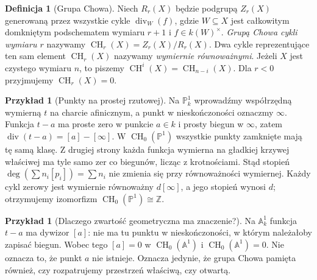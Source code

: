 \documentclass[11pt,a4paper,openany]{report}
\numberwithin{equation}{section}
\theoremstyle{plain}
\theoremstyle{definition}
\newtheorem{definicja}[twierdzenie]{Definicja}
\newtheorem{przyklad}[twierdzenie]{Przykład}
\theoremstyle{remark}
\newcommand{\Z}{\mathbb Z}
\newcommand{\A}{\mathbb A}
\newcommand{\PP}{\mathbb P}
\begin{document}
\begin{definicja}[Grupa Chowa]
\label{def:ga7-chow}
Niech $R_r(X)$ będzie podgrupą $Z_r(X)$ generowaną przez
wszystkie cykle $\operatorname{div}_W(f)$, gdzie
$W\subseteq X$ jest całkowitym domkniętym podschematem
wymiaru $r+1$ i $f\in k(W)^\times$.
\emph{Grupą Chowa cykli wymiaru $r$} nazywamy
$\operatorname{CH}_r(X)=Z_r(X)/R_r(X)$.
Dwa cykle reprezentujące ten sam element $\operatorname{CH}_r(X)$
nazywamy \emph{wymiernie równoważnymi}.
Jeżeli $X$ jest czystego wymiaru $n$, to piszemy
$\operatorname{CH}^i(X)=\operatorname{CH}_{n-i}(X)$.
Dla $r<0$ przyjmujemy $\operatorname{CH}_r(X)=0$.
\end{definicja}

\begin{przyklad}[Punkty na prostej rzutowej]
\label{prz:ga7-p1-points}
Na $\PP^1_k$ wprowadźmy współrzędną wymierną $t$ na
charcie afinicznym, a punkt w nieskończoności oznaczmy
$\infty$. Funkcja $t-a$ ma proste zero w punkcie $a\in k$
i prosty biegun w $\infty$, zatem
$\operatorname{div}(t-a)=[a]-[\infty]$.
W $\operatorname{CH}_0(\PP^1)$ wszystkie punkty zamknięte
mają tę samą klasę. Z drugiej strony każda funkcja wymierna
na gładkiej krzywej właściwej ma tyle samo zer co biegunów,
licząc z krotnościami. Stąd stopień
$\deg(\sum n_i[p_i])=\sum n_i$ nie zmienia się przy
równoważności wymiernej. Każdy cykl zerowy jest wymiernie
równoważny $d[\infty]$, a jego stopień wynosi $d$;
otrzymujemy izomorfizm $\operatorname{CH}_0(\PP^1)\cong\Z$.
\end{przyklad}

\begin{przyklad}[Dlaczego zwartość geometryczna ma znaczenie?]
\label{prz:ga7-a1-chow0}
Na $\A^1_k$ funkcja $t-a$ ma dywizor $[a]$:
nie ma tu punktu w nieskończoności, w którym należałoby
zapisać biegun. Wobec tego $[a]=0$ w
$\operatorname{CH}_0(\A^1)$ i $\operatorname{CH}_0(\A^1)=0$.
Nie oznacza to, że punkt $a$ nie istnieje. Oznacza jedynie,
że grupa Chowa pamięta również, czy rozpatrujemy przestrzeń
właściwą, czy otwartą.
\end{przyklad}
\end{document}
